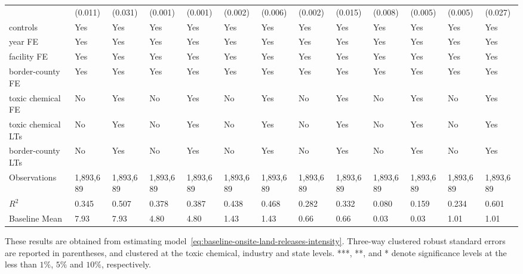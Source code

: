 \begin{table}[H]
{\begin{tabular}{@{}lllllllllllll@{}}
            & (0.011)   & (0.031)   & (0.001)   & (0.001)   & (0.002)   & (0.006)   & (0.002)   & (0.015)   & (0.008)   & (0.005) & (0.005) & (0.027)               \\
            controls           & Yes       & Yes       & Yes       & Yes       & Yes       & Yes       & Yes       & Yes       & Yes       & Yes       & Yes       & Yes       \\
            year FE            & Yes       & Yes       & Yes       & Yes       & Yes       & Yes       & Yes       & Yes       & Yes       & Yes       & Yes       & Yes       \\
            facility FE        & Yes       & Yes       & Yes       & Yes       & Yes       & Yes       & Yes       & Yes       & Yes       & Yes       & Yes       & Yes       \\
            border-county FE   & Yes       & Yes       & Yes       & Yes       & Yes       & Yes       & Yes       & Yes       & Yes       & Yes       & Yes       & Yes       \\
            toxic chemical FE  & No        & Yes       & No        & Yes       & No        & Yes       & No        & Yes       & No        & Yes       & No        & Yes       \\
            toxic chemical LTs & No        & Yes       & No        & Yes       & No        & Yes       & No        & Yes       & No        & Yes       & No        & Yes       \\
            border-county LTs  & No        & Yes       & No        & Yes       & No        & Yes       & No        & Yes       & No        & Yes       & No        & Yes       \\\midrule
            Observations       & 1,893,689 & 1,893,689 & 1,893,689 & 1,893,689 & 1,893,689 & 1,893,689 & 1,893,689 & 1,893,689 & 1,893,689 & 1,893,689 & 1,893,689 & 1,893,689 \\
            $R^2$              & 0.345     & 0.507     & 0.378     & 0.387     & 0.438     & 0.468     & 0.282     & 0.332     & 0.080     & 0.159     & 0.234     & 0.601     \\
            Baseline Mean      & 7.93      & 7.93      & 4.80      & 4.80      & 1.43      & 1.43      & 0.66      & 0.66      & 0.03      & 0.03      & 1.01      & 1.01      \\ \bottomrule\bottomrule
        \end{tabular}%
    }
    \begin{minipage}{\columnwidth}
        \vspace{0.05in}
        These results are obtained from estimating model~\ref{eq:baseline-onsite-land-releases-intensity}. Three-way clustered robust standard errors are reported in parentheses, and clustered at the toxic chemical, industry and state levels. ***, **, and * denote significance levels at the less than $1\%$, $5\%$ and $10\%$, respectively.
    \end{minipage}
\end{table}